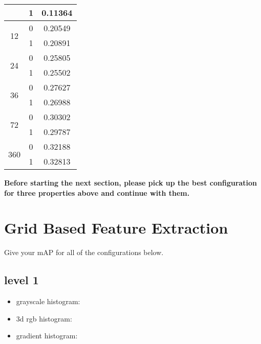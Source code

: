 \documentclass[12pt]{article}
\begin{document}
\begin{minipage}{\textwidth}
\begin{minipage}{0.49\textwidth}
\begin{tabular}{ | c | c | c | }
		   	\cline{2-3}
		    & 1 & 0.11364 \\
		  	\hline
		   	\multirow{2}{*}{12} & 0 & 0.20549 \\
		   	\cline{2-3}
		    & 1 & 0.20891 \\
		  	\hline
		   	\multirow{2}{*}{24} & 0 & 0.25805 \\
		   	\cline{2-3}
		    & 1 & 0.25502 \\
		  	\hline
		   	\multirow{2}{*}{36} & 0 & 0.27627 \\
		   	\cline{2-3}
		    & 1 & 0.26988 \\
		  	\hline
		   	\multirow{2}{*}{72} & 0 & 0.30302 \\
		   	\cline{2-3}
		   	& 1 & 0.29787 \\
		  	\hline
		  	\multirow{2}{*}{360} & 0 & 0.32188 \\
		   	\cline{2-3}
		   	& 1 & 0.32813 \\
		  	\hline
		\end{tabular}
		\captionsetup{width=.8\textwidth}
	\end{minipage}
\end{minipage}

\newpage
\textbf{Before starting the next section, please pick up the best configuration for three properties above and continue with them.}

\section{Grid Based Feature Extraction}
Give your mAP for all of the configurations below.

\subsection{level 1}
\begin{itemize}
\item grayscale histogram:
\item 3d rgb histogram:
\item gradient histogram:
\end{itemize}
\end{document}
